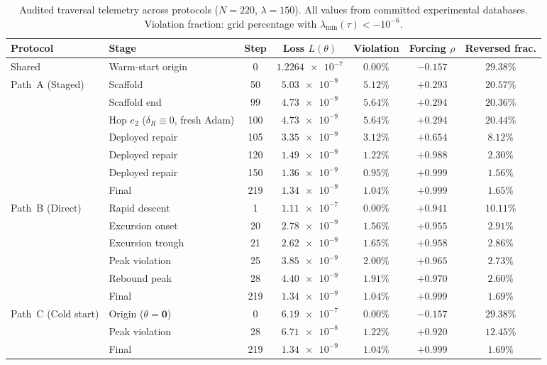\documentclass[preprint,aps,prb,longbibliography,superscriptaddress]{revtex4-2}
\newcommand{\dR}{\delta_R}
\begin{document}
\begin{table}[t]
\caption{Audited traversal telemetry across protocols ($N = 220$, $\lambda = 150$).
  All values from committed experimental databases.
  Violation fraction: grid percentage with $\lambda_{\min}(\tau) < -10^{-6}$.}\label{tab:telemetry}
\begin{ruledtabular}
\begin{tabular}{llccccc}
  Protocol & Stage & Step & Loss $L(\theta)$ & Violation & Forcing $\rho$ & Reversed frac. \\
  \midrule
  Shared & Warm-start origin & 0 & $\num{1.2264e-7}$ & $0.00\%$ & $-0.157$ & $29.38\%$ \\
  \midrule
  \multirow{7}{*}{Path~A (Staged)}
    & Scaffold & 50 & $\num{5.03e-9}$ & $5.12\%$ & $+0.293$ & $20.57\%$ \\
    & Scaffold end & 99 & $\num{4.73e-9}$ & $5.64\%$ & $+0.294$ & $20.36\%$ \\
    & Hop $e_2$ ($\dR \equiv 0$, fresh Adam) & 100 & $\num{4.73e-9}$ & $5.64\%$ & $+0.294$ & $20.44\%$ \\
    & Deployed repair & 105 & $\num{3.35e-9}$ & $3.12\%$ & $+0.654$ & $8.12\%$ \\
    & Deployed repair & 120 & $\num{1.49e-9}$ & $1.22\%$ & $+0.988$ & $2.30\%$ \\
    & Deployed repair & 150 & $\num{1.36e-9}$ & $0.95\%$ & $+0.999$ & $1.56\%$ \\
    & Final & 219 & $\num{1.34e-9}$ & $1.04\%$ & $+0.999$ & $1.65\%$ \\
  \midrule
  \multirow{6}{*}{Path~B (Direct)}
    & Rapid descent & 1 & $\num{1.11e-7}$ & $0.00\%$ & $+0.941$ & $10.11\%$ \\
    & Excursion onset & 20 & $\num{2.78e-9}$ & $1.56\%$ & $+0.955$ & $2.91\%$ \\
    & Excursion trough & 21 & $\num{2.62e-9}$ & $1.65\%$ & $+0.958$ & $2.86\%$ \\
    & Peak violation & 25 & $\num{3.85e-9}$ & $2.00\%$ & $+0.965$ & $2.73\%$ \\
    & Rebound peak & 28 & $\num{4.40e-9}$ & $1.91\%$ & $+0.970$ & $2.60\%$ \\
    & Final & 219 & $\num{1.34e-9}$ & $1.04\%$ & $+0.999$ & $1.69\%$ \\
  \midrule
  \multirow{3}{*}{Path~C (Cold start)}
    & Origin ($\theta = \mathbf{0}$) & 0 & $\num{6.19e-7}$ & $0.00\%$ & $-0.157$ & $29.38\%$ \\
    & Peak violation & 28 & $\num{6.71e-8}$ & $1.22\%$ & $+0.920$ & $12.45\%$ \\
    & Final & 219 & $\num{1.34e-9}$ & $1.04\%$ & $+0.999$ & $1.69\%$ \\
\end{tabular}
\end{ruledtabular}
\end{table}
\end{document}
